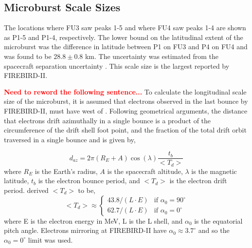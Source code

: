 \documentclass[draft, linenumbers]{agujournal}
\begin{document}
\subsection{Microburst Scale Sizes} \label{scale_size} %

 The locations where FU3 saw peaks 1-5 and where FU4 saw peaks 1-4 are shown as P1-5 and P1-4, respectively. The lower bound on the latitudinal extent of the microburst was the difference in latitude between P1 on FU3 and P4 on FU4 and was found to be $28.8 \pm 0.8$ km. The uncertainty was estimated from the spacecraft separation uncertainty . This scale size is the largest reported by FIREBIRD-II.

\textcolor{red}{\textbf{Need to reword the following sentence...}} To calculate the longitudinal scale size of the microburst, it is assumed that  electrons observed in the last bounce by FIREBIRD-II, must have  west of . Following geometrical arguments, the distance that electrons drift azimuthally in a single bounce is a product of the circumference of the drift shell foot point, and the fraction of the total drift orbit traversed in a single bounce and is given by, 

\begin{equation}
d_{az} = 2 \pi (R_E + A) \cos(\lambda) \frac{t_b}{<T_{d}>}
\label{bounce_drift}
\end{equation} where $R_E$ is the Earth's radius, $A$ is the spacecraft altitude, $\lambda$ is the magnetic latitude, $t_b$ is the electron bounce period, and $<T_{d}>$ is the electron drift period. \citet{Parks2003} derived $<T_{d}>$ to be,
\begin{equation}
<T_{d}> \approx
\begin{cases}
43.8 /(L \cdot E) & \text{if } \alpha_0 = 90^{\circ} \\    62.7/(L \cdot E) & \text{if } \alpha_0 = 0^{\circ}
\end{cases}
\label{drift}
\end{equation} where E is the electron energy in MeV, L is the L shell, and $\alpha_0$ is the equatorial pitch angle. Electrons mirroring at FIREBIRD-II have $\alpha_0 {\approx} 3.7^{\circ}$ and so the $\alpha_0 = 0^{\circ}$ limit was used.
\end{document}

